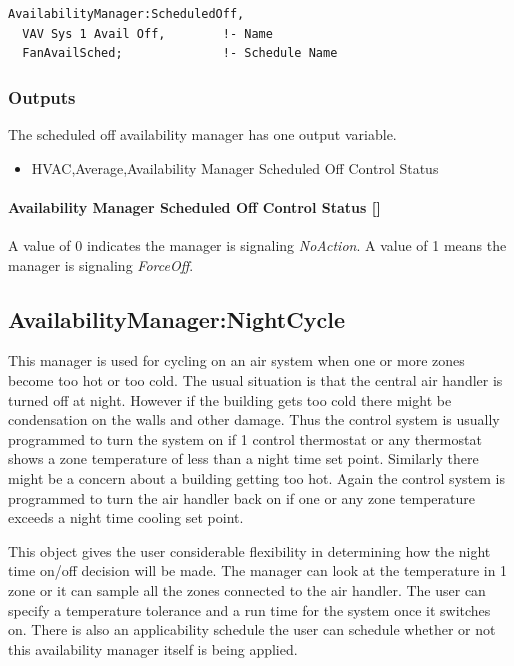 \begin{lstlisting}
AvailabilityManager:ScheduledOff,
  VAV Sys 1 Avail Off,        !- Name
  FanAvailSched;              !- Schedule Name
\end{lstlisting}

\subsubsection{Outputs}\label{outputs-1-027}

The scheduled off availability manager has one output variable.

\begin{itemize}
\tightlist
\item
  HVAC,Average,Availability Manager Scheduled Off Control Status
\end{itemize}

\paragraph{Availability Manager Scheduled Off Control Status {[]}}\label{availability-manager-scheduled-off-control-status}

A value of 0 indicates the manager is signaling \emph{NoAction}. A value of 1 means the manager is signaling \emph{ForceOff}.

\subsection{AvailabilityManager:NightCycle}\label{availabilitymanagernightcycle}

This manager is used for cycling on an air system when one or more zones become too hot or too cold. The usual situation is that the central air handler is turned off at night. However if the building gets too cold there might be condensation on the walls and other damage. Thus the control system is usually programmed to turn the system on if 1 control thermostat or any thermostat shows a zone temperature of less than a night time set point. Similarly there might be a concern about a building getting too hot. Again the control system is programmed to turn the air handler back on if one or any zone temperature exceeds a night time cooling set point.

This object gives the user considerable flexibility in determining how the night time on/off decision will be made. The manager can look at the temperature in 1 zone or it can sample all the zones connected to the air handler. The user can specify a temperature tolerance and a run time for the system once it switches on. There is also an applicability schedule the user can schedule whether or not this availability manager itself is being applied.

